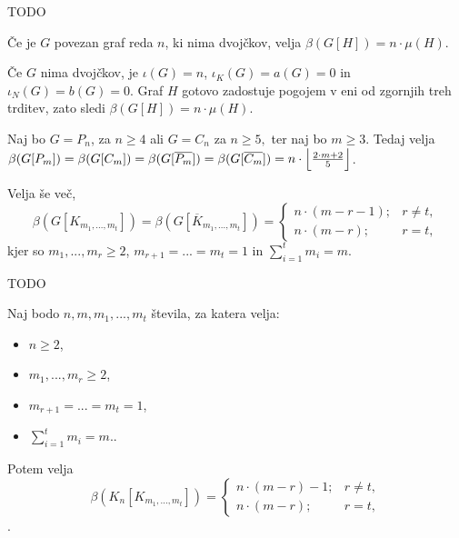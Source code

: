 \documentclass[mat1, tisk]{fmfdelo}
\newcommand{\1}{(1, 1, ..., 1)}
\newcommand{\2}{(2, 2, ..., 2)}
\begin{document}
\begin{dokaz}
    TODO
\end{dokaz}


\begin{izrek}
    Če je $G$ povezan graf reda $n$, ki nima dvojčkov, velja $\beta(G[H]) = n \cdot \mu(H).$
\end{izrek}

\begin{dokaz}
    Če $G$ nima dvojčkov, je $\iota(G) = n$, $\iota_K(G) = a(G) = 0$ in $\iota_N(G) = b(G) = 0.$
    Graf $H$ gotovo zadostuje pogojem v eni od zgornjih treh trditev, zato sledi  
    $\beta(G[H]) = n \cdot \mu(H).$
\end{dokaz}


\begin{izrek}
    Naj bo $G = P_n$, za $n\geq 4$ ali $G = C_n$ za $n \geq 5,$ ter naj bo $m\geq 3.$ Tedaj velja
    $\beta(G[P_m]) = \beta(G[C_m]) = \beta(G[\overline{P_m}]) = \beta(G[\overline{C_m}]) = 
    n \cdot  \Bigl \lfloor \frac{2\cdot m + 2}{5} \Bigr \rfloor $.

    Velja še več, 
    $$\beta(G[K_{m_1, ..., m_t}]) = \beta(G[\overline{K}_{m_1, ..., m_t}]) = 
    \begin{cases}
        n \cdot (m - r - 1); & r \neq t, \\
        n \cdot (m - r); & r = t, 
    \end{cases} $$
    kjer so $m_1, ..., m_r \geq 2$,  $m_{r+1} = ... = m_t = 1$ in $\sum_{i= 1}^{t} m_i = m.$
\end{izrek}

\begin{dokaz}
    TODO
\end{dokaz}

\begin{izrek}
    Naj bodo $n, m, m_1, ..., m_t$ števila, za katera velja:
    \begin{itemize}
        \item $n \geq 2$,
        \item $m_1, ..., m_r \geq 2$,
        \item $m_{r+1} = ... = m_t = 1$,
        \item $\sum_{i= 1}^{t} m_i = m.$.
    \end{itemize}
    Potem velja
    $$\beta(K_n[K_{m_1, ..., m_t}]) = 
    \begin{cases}
        n \cdot (m - r) - 1; & r \neq t, \\
        n \cdot (m - r); & r = t, 
    \end{cases} $$.
\end{izrek}
\end{document}
